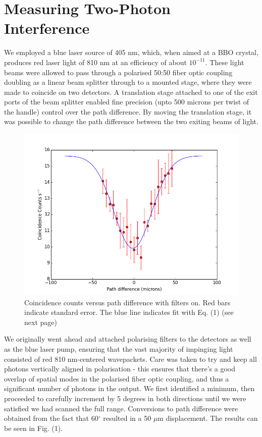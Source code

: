 \documentclass[10pt,a4paper]{article}
\begin{document}
\section*{Measuring Two-Photon Interference}
We employed a blue laser source of 405 nm, which, when aimed at a BBO crystal, produces red laser light of 810 nm at an efficiency of about $10^{-11}$. These light beams were allowed to pass through a polarised 50:50 fiber optic coupling doubling as a linear beam splitter through to a mounted stage, where they were made to coincide on two detectors. A translation stage attached to one of the exit ports of the beam splitter enabled fine precision (upto 500 microns per twist of the handle) control over the path difference. By moving the translation stage, it was possible to change the path difference between the two exiting beams of light.
\begin{figure}[H]
\centering
\includegraphics[scale=0.46]{../Analysis/figure_1.png}
\caption{Coincidence counts versus path difference with filters on. Red bars indicate standard error. The blue line indicates fit with Eq. (1) (see next page)}
\end{figure}
\noindent We originally went ahead and attached polarising filters to the detectors as well as the blue laser pump, ensuring that the vast majority of impinging light consisted of red 810 nm-centered wavepackets. Care was taken to try and keep all photons vertically aligned in polarisation - this ensures that there's a good overlap of spatial modes in the polarised fiber optic coupling, and thus a significant number of photons in the output. We first identified a minimum, then proceeded to carefully increment by 5 degrees in both directions until we were satisfied we had scanned the full range. Conversions to path difference were obtained from the fact that 60$^{\circ}$ resulted in a 50 $\mu$m displacement. The results can be seen in Fig. (1).\\
\end{document}
